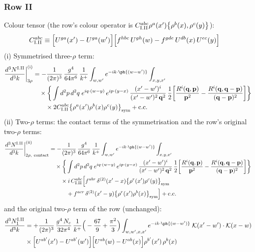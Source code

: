 \subsubsection*{Row II}
Colour tensor (the row's colour operator is $C^{abc}_{{\rm I.II}}\rho^{a}(x')\big\{\rho^{b}(x),\rho^{c}(y)\big\}$):
\begin{align}
C^{abc}_{{\rm I.II}}&\equiv \Big[U^{ga}(x')-U^{ga}(w')\Big]\Big[f^{hbc}\,U^{gh}(w)-f^{gde}\,U^{db}(x)\,U^{ec}(y)\Big]\notag
\end{align}
(i) Symmetrised three-$\rho$ term:
\begin{align}
\frac{d^{3}N^{\rm I.II}}{d^{3}k}\bigg|^{\rm (i)}_{3\rho}&=-\frac{1}{(2\pi)^{3}}\,\frac{g^{4}}{64\pi^{6}}\,\frac{1}{k^{+}}\int_{w,w'}e^{-ik\cdot\ph{(w-w')}}\int_{x,y,x'}\notag\\
&\quad\times\bigg\{\int d^{2}p\,d^{2}q\;e^{iq\cdot(w-y)}\,e^{ip\cdot(y-x)}\,\frac{(x'-w')^{i}}{(x'-w')^{2}\,\mathbf{q}^{2}}\,\frac{1}{2}\bigg[\frac{R^{i}(\mathbf{q},\mathbf{p})}{\mathbf{p}^{2}}-\frac{R^{i}(\mathbf{q},\mathbf{q}-\mathbf{p})}{(\mathbf{q}-\mathbf{p})^{2}}\bigg]\bigg\}\notag\\
&\qquad\times 2C^{abc}_{{\rm I.II}}\big\{\rho^{a}(x')\rho^{b}(x)\rho^{c}(y)\big\}_{\rm sym}+{\rm c.c.}\label{eq:D-I.II-3}
\end{align}
(ii) Two-$\rho$ terms: the contact terms of the symmetrisation and the row's original two-$\rho$ terms:
\begin{align}
\frac{d^{3}N^{\rm I.II}}{d^{3}k}\bigg|^{\rm (ii)}_{2\rho,\ {\rm contact}}&=-\frac{1}{(2\pi)^{3}}\,\frac{g^{4}}{64\pi^{6}}\,\frac{1}{k^{+}}\int_{w,w'}e^{-ik\cdot\ph{(w-w')}}\int_{x,y,x'}\notag\\
&\quad\times\bigg\{\int d^{2}p\,d^{2}q\;e^{iq\cdot(w-y)}\,e^{ip\cdot(y-x)}\,\frac{(x'-w')^{i}}{(x'-w')^{2}\,\mathbf{q}^{2}}\,\frac{1}{2}\bigg[\frac{R^{i}(\mathbf{q},\mathbf{p})}{\mathbf{p}^{2}}-\frac{R^{i}(\mathbf{q},\mathbf{q}-\mathbf{p})}{(\mathbf{q}-\mathbf{p})^{2}}\bigg]\bigg\}\notag\\
&\qquad\times i\,C^{abc}_{{\rm I.II}}\Big[f^{abr}\,\delta^{(2)}(x'-x)\big\{\rho^{r}(x')\rho^{c}(y)\big\}_{\rm sym}\notag\\
&\qquad\quad +f^{acr}\,\delta^{(2)}(x'-y)\big\{\rho^{r}(x')\rho^{b}(x)\big\}_{\rm sym}\Big]+{\rm c.c.}\label{eq:D-I.II-2}
\end{align}
and the original two-$\rho$ term of the row (unchanged):
\begin{align}
\frac{d^{3}N^{\rm I.II}_{1}}{d^{3}k} & = +\frac{1}{(2\pi)^{3}}\,\frac{g^{4}\,N_{c}}{32\pi^{4}}\,\frac{1}{k^{+}}\Big(-\frac{67}{9}+\frac{\pi^{2}}{3}\Big)\int_{w,w',x,x'} e^{-ik\cdot\ph{(w-w')}}\;\mathcal{K}(x'-w')\cdot\mathcal{K}(x-w)\notag \\
& \times\Big[U^{ab'}(x')-U^{ab'}(w')\Big]\Big[U^{ab}(w)-U^{ab}(x)\Big]\rho^{b'}(x')\,\rho^{b}(x)\label{eq:D-I.II-2o}
\end{align}
